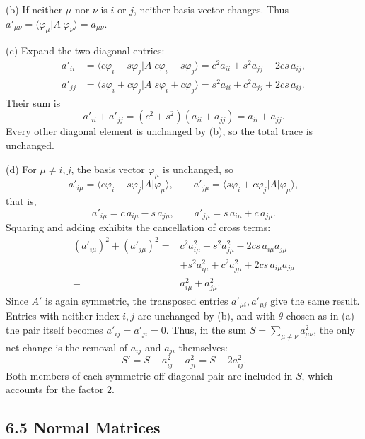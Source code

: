 (b) If neither $\mu$ nor $\nu$ is $i$ or $j$, neither basis vector
changes. Thus
$a'_{\mu\nu}=\langle\varphi_\mu|A|\varphi_\nu\rangle=a_{\mu\nu}$.

(c) Expand the two diagonal entries:
\begin{align*}
a'_{ii}
&=\langle c\varphi_i-s\varphi_j|A|c\varphi_i-s\varphi_j\rangle
=c^2a_{ii}+s^2a_{jj}-2cs\,a_{ij},\\
a'_{jj}
&=\langle s\varphi_i+c\varphi_j|A|s\varphi_i+c\varphi_j\rangle
=s^2a_{ii}+c^2a_{jj}+2cs\,a_{ij}.
\end{align*}
Their sum is
\[
a'_{ii}+a'_{jj}=(c^2+s^2)(a_{ii}+a_{jj})=a_{ii}+a_{jj}.
\]
Every other diagonal element is unchanged by (b), so the total trace
is unchanged.

(d) For $\mu\ne i,j$, the basis vector $\varphi_\mu$ is unchanged, so
\[
a'_{i\mu}=\langle c\varphi_i-s\varphi_j|A|\varphi_\mu\rangle,\qquad
a'_{j\mu}=\langle s\varphi_i+c\varphi_j|A|\varphi_\mu\rangle,
\]
that is,
\[
\boxed{a'_{i\mu}=c\,a_{i\mu}-s\,a_{j\mu},\qquad
       a'_{j\mu}=s\,a_{i\mu}+c\,a_{j\mu}.}
\]
Squaring and adding exhibits the cancellation of cross terms:
\begin{align*}
(a'_{i\mu})^2+(a'_{j\mu})^2
={}&c^2a_{i\mu}^2+s^2a_{j\mu}^2-2cs\,a_{i\mu}a_{j\mu}\\
&+s^2a_{i\mu}^2+c^2a_{j\mu}^2+2cs\,a_{i\mu}a_{j\mu}\\
={}&a_{i\mu}^2+a_{j\mu}^2.
\end{align*}
Since $A'$ is again symmetric, the transposed entries
$a'_{\mu i},a'_{\mu j}$ give the same result. Entries with neither
index $i,j$ are unchanged by (b), and with $\theta$ chosen as in (a)
the pair itself becomes $a'_{ij}=a'_{ji}=0$. Thus, in the sum
$S=\sum_{\mu\ne\nu}a_{\mu\nu}^2$, the only net change is the removal
of $a_{ij}$ and $a_{ji}$ themselves:
\[
\boxed{S'=S-a_{ij}^2-a_{ji}^2=S-2a_{ij}^2.}
\]
Both members of each symmetric off-diagonal pair are included in $S$,
which accounts for the factor $2$.

\subsection*{6.5 Normal Matrices}

